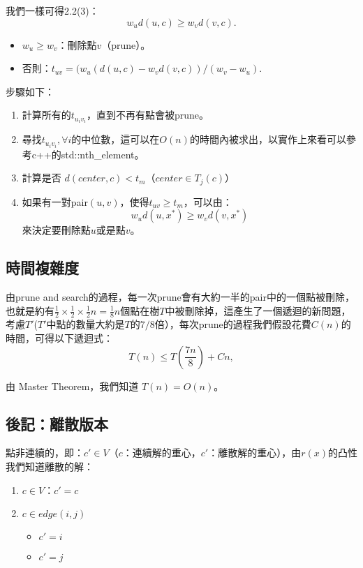 \documentclass[15pt]{extarticle}
\begin{document}
我們一樣可得2.2(3)：
\begin{equation*}
    w_ud(u,c)\ge w_vd(v,c). \tag{3}
\end{equation*}

\begin{itemize}
    \item $w_u\ge w_v$：刪除點$v$（prune）。
    \item 否則：$t_{uv} = (w_u(d(u,c) - w_vd(v,c)) / (w_v - w_u).$
\end{itemize}

步驟如下：
\begin{enumerate}
    \item 計算所有的$t_{u_iv_i}$，直到不再有點會被prune。
    \item 尋找$t_{u_iv_i}, \forall i$的中位數，這可以在$O(n)$的時間內被求出，以實作上來看可以參考c++的std::nth\_element。
    \item 計算是否 $d(center, c) < t_m$（$center\in T_j(c)$）
    \item 如果有一對pair$(u,v)$，使得$t_{uv}\ge t_m$，可以由：$$w_ud(u,x^*)\ge w_vd(v,x^*)$$ 來決定要刪除點$u$或是點$v$。
\end{enumerate}

\newpage
\subsection{時間複雜度}
由prune and search的過程，每一次prune會有大約一半的pair中的一個點被刪除，也就是約有$\frac{1}{2}\times\frac{1}{2}\times\frac{1}{2}n=\frac{1}{8}n$個點在樹$T$中被刪除掉，這產生了一個遞迴的新問題，考慮$T'$($T'$中點的數量大約是$T$的$7/8$倍），每次prune的過程我們假設花費$C(n)$的時間，可得以下遞迴式：$$T(n) \le T(\frac{7n}{8}) + Cn,$$

由 Master Theorem，我們知道 $T(n)=O(n)$。

\subsection{後記：離散版本}
點非連續的，即：$c'\in V$（$c$：連續解的重心，$c'$：離散解的重心），由$r(x)$的凸性我們知道離散的解：
\begin{enumerate}
    \item $c\in V$：$c'=c$
    \item $c\in edge(i, j)$
    \begin{itemize}
        \item $c' = i$
        \item $c' = j$
    \end{itemize}
\end{enumerate}
\end{document}
